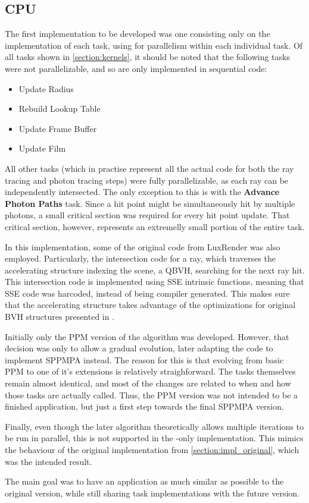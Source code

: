 \documentclass[main.tex]{subfiles}
\begin{document}
\subsection{CPU} \label{section:impl_cpu}

The first implementation to be developed was one consisting only on the implementation of each task, using \openmp for parallelism within each individual task. Of all tasks shown in \cref{section:kernels}, it should be noted that the following tasks were not parallelizable, and so are only implemented in sequential code:
\begin{itemize}
  \item Update Radius
  \item Rebuild Lookup Table
  \item Update Frame Buffer
  \item Update Film
\end{itemize}

All other tasks (which in practise represent all the actual code for both the ray tracing and photon tracing steps) were fully parallelizable, as each ray can be independently intersected. The only exception to this is with the \textbf{Advance Photon Paths} task. Since a hit point might be simultaneously hit by multiple photons, a small critical section was required for every hit point update. That critical section, however, represents an extremelly small portion of the entire task.

In this implementation, some of the original code from LuxRender was also employed. Particularly, the intersection code for a ray, which traverses the accelerating structure indexing the scene, a \acf{QBVH}, searching for the next ray hit.
This intersection code is implemented using SSE intrinsic functions, meaning that SSE code was harcoded, instead of being compiler generated. This makes sure that the accelerating structure takes advantage of the optimizations for original \acs{BVH} structures presented in \cite{dammertz2008shallow}.


Initially only the PPM version of the algorithm was developed. However, that decision was only to allow a gradual evolution, later adapting the code to implement SPPMPA instead. The reason for this is that evolving from basic PPM to one of it's extensions is relatively straighforward. The tasks themselves remain almost identical, and most of the changes are related to when and how those tasks are actually called. Thus, the PPM version was not intended to be a finished application, but just a first step towards the final SPPMPA version.

Finally, even though the later algorithm theoretically allows multiple iterations to be run in parallel, this is not supported in the \cpu-only implementation. This mimics the behaviour of the original implementation from \cref{section:impl_original}, which was the intended result.

The main goal was to have an application as much similar as possible to the original \cpu version, while still sharing task implementations with the future \starpu version.
\end{document}

